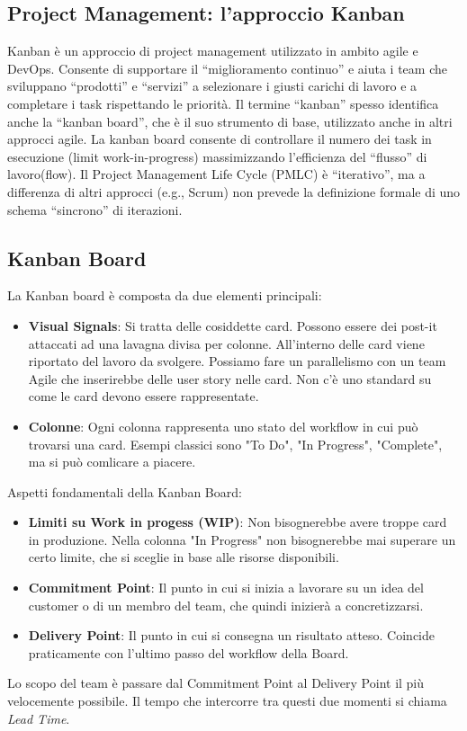 \subsection{Project Management: l’approccio Kanban}
Kanban è un approccio di project management utilizzato in ambito agile e DevOps.
Consente di supportare il “miglioramento continuo” e aiuta i team che sviluppano “prodotti” e “servizi” a selezionare i giusti carichi di lavoro e a completare i task rispettando le priorità.
Il termine “kanban” spesso identifica anche la “kanban board”, che è il suo strumento di base, utilizzato anche in altri approcci agile. La kanban board consente di controllare il numero dei task in esecuzione
(limit work-in-progress) massimizzando l’efficienza del “flusso” di lavoro(flow).\newline
Il Project Management Life Cycle (PMLC) è “iterativo”, ma a differenza di altri approcci (e.g., Scrum) non prevede la definizione formale di uno schema “sincrono” di iterazioni.
\subsection{Kanban Board}
La Kanban board è composta da due elementi principali:
\begin{itemize}
	\item \textbf{Visual Signals}: Si tratta delle cosiddette card. Possono essere dei post-it attaccati ad una lavagna divisa per colonne. All'interno delle card viene riportato del lavoro da svolgere. Possiamo fare un parallelismo con un team Agile che inserirebbe delle user story nelle card. Non c'è uno standard su come le card devono essere rappresentate.
	\item \textbf{Colonne}: Ogni colonna rappresenta uno stato del workflow in cui può trovarsi una card. Esempi classici sono "To Do", "In Progress", "Complete", ma si può comlicare a piacere.
\end{itemize}

Aspetti fondamentali della Kanban Board:
\begin{itemize}
	\item \textbf{Limiti su Work in progess (WIP)}: Non bisognerebbe avere troppe card in produzione. Nella colonna "In Progress" non bisognerebbe mai superare un certo limite, che si sceglie in base alle risorse disponibili.
	\item \textbf{Commitment Point}: Il punto in cui si inizia a lavorare su un idea del customer o di un membro del team, che quindi inizierà a concretizzarsi.
	\item \textbf{Delivery Point}: Il punto in cui si consegna un risultato atteso. Coincide praticamente con l'ultimo passo del workflow della Board.
\end{itemize}
\begin{info}
	Lo scopo del team è passare dal Commitment Point al Delivery Point il più velocemente possibile. Il tempo che intercorre tra questi due momenti si chiama \textit{Lead Time}.
\end{info}

